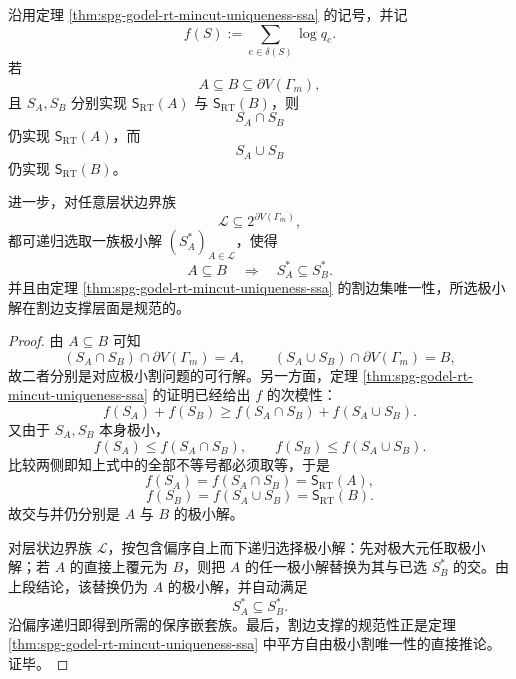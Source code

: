 \begin{theorem}\label{thm:conclusion-squarefree-rt-laminar-nesting}
沿用定理 \ref{thm:spg-godel-rt-mincut-uniqueness-ssa} 的记号，并记
\[
f(S):=\sum_{e\in\delta(S)}\log q_e.
\]
若
\[
A\subseteq B\subseteq \partial V(\Gamma_m),
\]
且 \(S_A,S_B\) 分别实现 \(\mathsf S_{\mathrm{RT}}(A)\) 与 \(\mathsf S_{\mathrm{RT}}(B)\)，则
\[
S_A\cap S_B
\]
仍实现 \(\mathsf S_{\mathrm{RT}}(A)\)，而
\[
S_A\cup S_B
\]
仍实现 \(\mathsf S_{\mathrm{RT}}(B)\)。

进一步，对任意层状边界族
\[
\mathcal L\subseteq 2^{\partial V(\Gamma_m)},
\]
都可递归选取一族极小解 \((S_A^\ast)_{A\in\mathcal L}\)，使得
\[
A\subseteq B
\quad\Longrightarrow\quad
S_A^\ast\subseteq S_B^\ast.
\]
并且由定理 \ref{thm:spg-godel-rt-mincut-uniqueness-ssa} 的割边集唯一性，所选极小解在割边支撑层面是规范的。
\end{theorem}
\begin{proof}
由 \(A\subseteq B\) 可知
\[
(S_A\cap S_B)\cap \partial V(\Gamma_m)=A,
\qquad
(S_A\cup S_B)\cap \partial V(\Gamma_m)=B,
\]
故二者分别是对应极小割问题的可行解。另一方面，定理 \ref{thm:spg-godel-rt-mincut-uniqueness-ssa} 的证明已经给出 \(f\) 的次模性：
\[
f(S_A)+f(S_B)\ge f(S_A\cap S_B)+f(S_A\cup S_B).
\]
又由于 \(S_A,S_B\) 本身极小，
\[
f(S_A)\le f(S_A\cap S_B),
\qquad
f(S_B)\le f(S_A\cup S_B).
\]
比较两侧即知上式中的全部不等号都必须取等，于是
\[
f(S_A)=f(S_A\cap S_B)=\mathsf S_{\mathrm{RT}}(A),
\]
\[
f(S_B)=f(S_A\cup S_B)=\mathsf S_{\mathrm{RT}}(B).
\]
故交与并仍分别是 \(A\) 与 \(B\) 的极小解。

对层状边界族 \(\mathcal L\)，按包含偏序自上而下递归选择极小解：先对极大元任取极小解；若 \(A\) 的直接上覆元为 \(B\)，则把 \(A\) 的任一极小解替换为其与已选 \(S_B^\ast\) 的交。由上段结论，该替换仍为 \(A\) 的极小解，并自动满足
\[
S_A^\ast\subseteq S_B^\ast.
\]
沿偏序递归即得到所需的保序嵌套族。最后，割边支撑的规范性正是定理 \ref{thm:spg-godel-rt-mincut-uniqueness-ssa} 中平方自由极小割唯一性的直接推论。证毕。
\end{proof}

